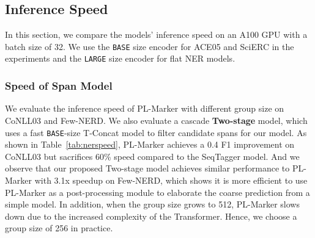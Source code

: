\documentclass[11pt]{article}
\newcommand\Ourmodel{PL-Marker\xspace}
\begin{document}
\subsection{Inference Speed}
\label{sec:compare_speed}
In this section, we compare the models' inference speed on an  A100 GPU with a batch size of 32. We use the \texttt{BASE} size encoder for ACE05 and SciERC in the experiments and  the \texttt{LARGE} size encoder for flat NER models.








\subsubsection{Speed of Span Model}
\label{sec:compare_ner}

We evaluate the inference speed of \Ourmodel with different group size  on CoNLL03 and Few-NERD.  We also evaluate a cascade \textbf{Two-stage} model, which  uses a fast \texttt{BASE}-size T-Concat model to filter candidate spans for our model.
As shown in  Table~\ref{tab:nerspeed},  \Ourmodel achieves a 0.4 F1 improvement on CoNLL03 but sacrifices 60\% speed compared to the SeqTagger model. 
And we observe that our proposed Two-stage model achieves similar performance to \Ourmodel with  3.1x speedup on Few-NERD, which shows it is more efficient to use \Ourmodel as a post-processing module to elaborate the coarse prediction from a simple model.  
In addition, when the group size grows to 512, \Ourmodel slows down due to the increased complexity of the Transformer. Hence, we choose a group size of 256 in practice. 
\end{document}
